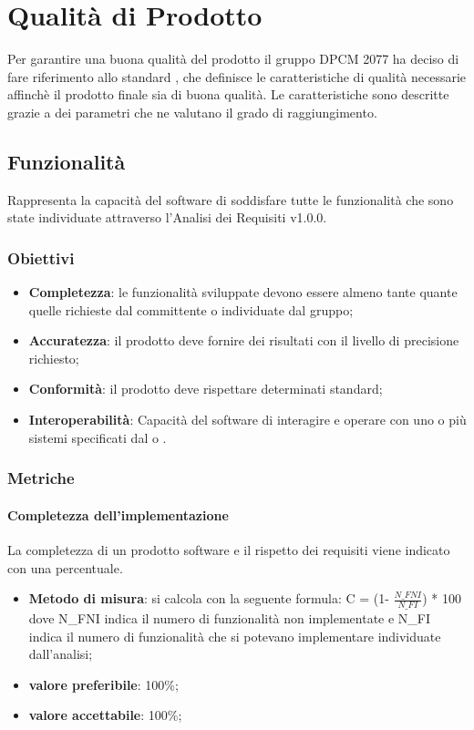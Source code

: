 \section{Qualità di Prodotto}

Per garantire una buona qualità del prodotto il gruppo DPCM 2077 ha deciso di fare riferimento allo standard ,
che definisce le caratteristiche di qualità necessarie affinchè il prodotto finale sia di buona qualità.
Le caratteristiche sono descritte grazie a dei parametri che ne valutano il grado di raggiungimento.

\subsection{Funzionalità}
Rappresenta la capacità del software di soddisfare tutte le funzionalità che sono state individuate attraverso l'Analisi dei Requisiti v1.0.0.
\subsubsection{Obiettivi}
\begin{itemize}
\item {\textbf{Completezza}: le funzionalità sviluppate devono essere almeno tante quante quelle richieste dal committente o individuate dal gruppo;}
\item {\textbf{Accuratezza}: il prodotto deve fornire dei risultati con il livello di precisione richiesto;}
\item {\textbf{Conformità}: il prodotto deve rispettare determinati standard;} 
\item {\textbf{Interoperabilità}: Capacità del software di interagire e operare con uno o più sistemi specificati dal  o .}
\end{itemize}

\subsubsection{Metriche}
\paragraph{Completezza dell'implementazione}
La completezza di un prodotto software e il rispetto dei requisiti viene indicato con una percentuale.
\begin{itemize}
\item \textbf{Metodo di misura}: si calcola con la seguente formula:
C = (1- $\frac{N\_FNI}{N\_FI}$) * 100
dove N\_FNI indica il numero di funzionalità non implementate e N\_FI indica il numero di funzionalità che si potevano implementare individuate dall'analisi;
\item \textbf{valore preferibile}: 100\%;
\item \textbf{valore accettabile}: 100\%;
\end{itemize}

